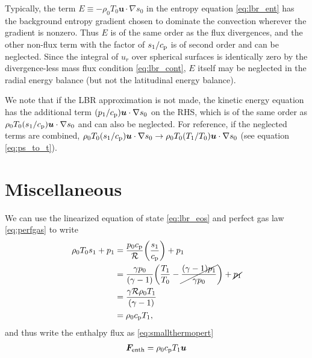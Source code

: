 \documentclass[12pt]{article} %
\newcommand{\cp}{c_{\rm{p}}}
\begin{document}
	Typically, the term $E\equiv-\rho_0T_0\bm{u}\cdot\nabla s_0$ in the entropy equation \eqref{eq:lbr_ent} has the background entropy gradient chosen to dominate the convection wherever the gradient is nonzero. Thus $E$ is of the same order as the flux divergences, and the other non-flux term with the factor of $s_1/\cp$ is of second order and can be neglected. Since the integral of $u_r$ over spherical surfaces is identically zero by the divergence-less mass flux condition \eqref{eq:lbr_cont}, $E$ itself may be neglected in the radial energy balance (but not the latitudinal energy balance). 
	
	We note that if the LBR approximation is not made, the kinetic energy equation has the additional term $(p_1/\cp)\bm{u}\cdot\nabla s_0$ on the RHS, which is of the same order as $\rho_0T_0(s_1/\cp)\bm{u}\cdot\nabla s_0$ and can also be neglected. For reference, if the neglected terms are combined, $\rho_0T_0(s_1/\cp)\bm{u}\cdot\nabla s_0\rightarrow \rho_0T_0(T_1/T_0)\bm{u}\cdot\nabla s_0$ (see equation \eqref{eq:ps_to_t}). 
	
	\section{Miscellaneous}  %
	We can use the linearized equation of state \eqref{eq:lbr_eos} and perfect gas law \eqref{eq:perfgas} to write
	\begin{align}
	\rho_0 T_0 s_1 + p_1 &= \frac{p_0{\cp}}{\mathcal{R}}\bigg{(}\frac{s_1}{{\cp}}\bigg{)} + p_1\nonumber\\
	&= \frac{\gamma p_0}{(\gamma-1)}\bigg{(}\frac{T_1}{T_0}-\cancel{\frac{(\gamma-1)p_1}{\gamma p_0}}\bigg{)} + \cancel{p_1}\nonumber\\
	&= \frac{\gamma\mathcal{R}\rho_0T_1}{(\gamma - 1)}\nonumber\\
	&= \rho_0{\cp}T_1,\label{eq:ps_to_t}
	\end{align}
	and thus write the enthalpy flux as \eqref{eq:smallthermopert}
	\begin{align}
	\bm{F}_{\rm{enth}}=\rho_0{\cp}T_1\bm{u}
	\end{align}
\end{document}

